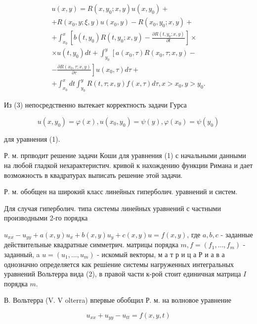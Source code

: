 \documentclass[10pt]{article}
\begin{document}
\[

\begin{gathered}

u(x, y)=R\left(x, y_{0} ; x, y\right) u\left(x, y_{0}\right)+ \\

+R\left(x_{0}, y ; \xi, y\right) u\left(x_{0}, y\right)-R\left(x_{0}, y_{0} ; x, y\right)+ \\

+\int_{x_{0}}^{x}\left[b\left(t, y_{0}\right) R\left(t, y_{0} ; x, y\right)-\frac{\partial R\left(t, y_{0} ; x, y\right)}{\partial t}\right] \times \\

\times u\left(t, y_{0}\right) d t+\int_{y_{0}}^{y}\left[a\left(x_{0}, \tau\right) R\left(x_{0}, \tau ; x, y\right)-\right. \\

\left.-\frac{\partial R\left(x_{0}, \tau ; x, y\right)}{\partial \tau}\right] u\left(x_{0}, \tau\right) d \tau+ \\

+\int_{x_{0}}^{x} d t \int_{y_{0}}^{y} R(t, \tau ; x, y) f(x, \tau) d \tau, x>x_{0}, y>y_{0} .

\end{gathered}

\]



Из (3) непосредственно вытекает корректность задачи Гурса



\[

u\left(x, y_{0}\right)=\varphi(x), u\left(x_{0}, y_{0}\right)=\psi(y), \varphi\left(x_{0}\right)=\psi\left(y_{0}\right)

\]



для уравнения (1).



Р. м. прпводит решение задачи Коши для уравнения (1) с начальными данными на любой гладкой нехарактеристич. кривой к нахождению функции Римана и дает возможность в квадратурах выписать решение этой задачи.



Р. м. обобщен на широкий класс линейных гиперболич. уравнений и систем.



Для случая гиперболич. типа системы линейных уравнений с частными производными 2-го порядка



$u_{x x}-u_{y y}+a(x, y) u_{x}+b(x, y) u_{y}+c(x, y) u=f(x, y)$, где $a, b, c$ - заданные действительные квадратные симметрич. матрицы порядка $m, f=\left(f_{1}, \ldots, f_{m}\right)$ - заданныӥ, a $u=\left(u_{1}, \ldots, u_{m}\right)$ - искомый векторы, м а т р и ц а Р и а в а однозначно определяется как решіение системы нагруженных интегральных уравнений Вольтерра вида (2), в правой части к-рой стоит единичная матрица $I$ порядка $m$.



В. Вольтерра (V. V olterra) впервые обобщил Р. м. на волновое уравнение



\[

u_{x x}+u_{y y}-u_{t t}=f(x, y, t)

\]
\end{document}
